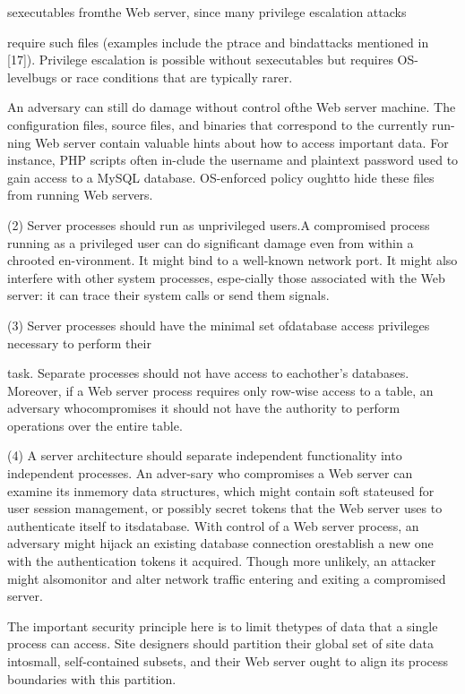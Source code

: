 s\Gamma \Delta \Theta \Lambda \Xi  executables fromthe Web server, since many privilege escalation attacks

require such files (examples include the ptrace and bindattacks mentioned in [17]). Privilege escalation is possible without s\Gamma \Delta \Theta \Lambda \Xi  executables but requires OS-levelbugs or race conditions that are typically rarer.

An adversary can still do damage without control ofthe Web server machine. The configuration files, source
files, and binaries that correspond to the currently run-ning Web server contain valuable hints about how to access important data. For instance, PHP scripts often in-clude the username and plaintext password used to gain
access to a MySQL database. OS-enforced policy oughtto hide these files from running Web servers.

(2) Server processes should run as unprivileged users.A compromised process running as a privileged user can
do significant damage even from within a chrooted en-vironment. It might bind to a well-known network port.
It might also interfere with other system processes, espe-cially those associated with the Web server: it can trace
their system calls or send them signals.

(3) Server processes should have the minimal set ofdatabase access privileges necessary to perform their

task. Separate processes should not have access to eachother's databases. Moreover, if a Web server process requires only row-wise access to a table, an adversary whocompromises it should not have the authority to perform
operations over the entire table.

(4) A server architecture should separate independent functionality into independent processes. An adver-sary who compromises a Web server can examine its inmemory data structures, which might contain soft stateused for user session management, or possibly secret tokens that the Web server uses to authenticate itself to itsdatabase. With control of a Web server process, an adversary might hijack an existing database connection orestablish a new one with the authentication tokens it acquired. Though more unlikely, an attacker might alsomonitor and alter network traffic entering and exiting a
compromised server.

The important security principle here is to limit thetypes of data that a single process can access. Site designers should partition their global set of site data intosmall, self-contained subsets, and their Web server ought
to align its process boundaries with this partition.

